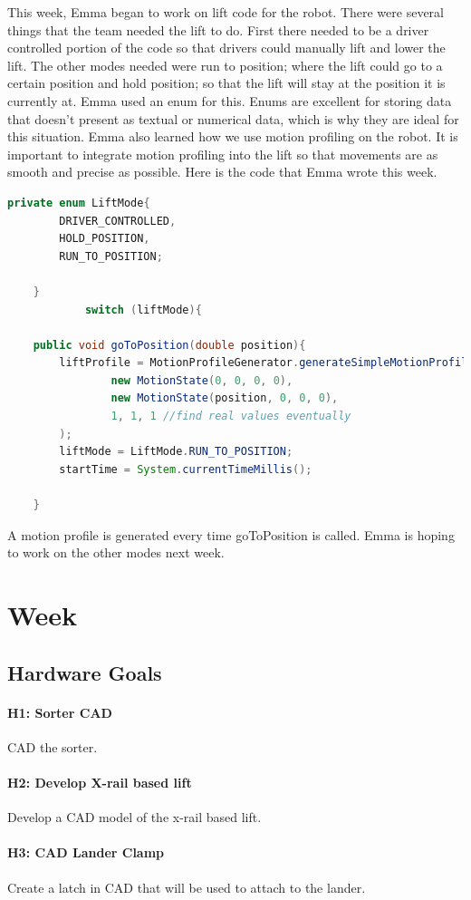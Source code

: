 \documentclass{article}
\begin{document}
This week, Emma began to work on lift code for the robot. There were several things that the team needed the lift to do. First there needed to be a driver controlled portion of the code so that drivers could manually lift and lower the lift. The other modes needed were run to position; where the lift could go to a certain position and hold position; so that the lift will stay at the position it is currently at. Emma used an enum for this. Enums are excellent for storing data that doesn't present as textual or numerical data, which is why they are ideal for this situation. Emma also learned how we use motion profiling on the robot. It is important to integrate motion profiling into the lift so that movements are as smooth and precise as possible. Here is the code that Emma wrote this week.
\begin{lstlisting}[language=Java]
    private enum LiftMode{
        DRIVER_CONTROLLED,
        HOLD_POSITION,
        RUN_TO_POSITION;

    }
            switch (liftMode){

    public void goToPosition(double position){
        liftProfile = MotionProfileGenerator.generateSimpleMotionProfile(
                new MotionState(0, 0, 0, 0),
                new MotionState(position, 0, 0, 0),
                1, 1, 1 //find real values eventually
        );
        liftMode = LiftMode.RUN_TO_POSITION;
        startTime = System.currentTimeMillis();

    }
\end{lstlisting}
A motion profile is generated every time goToPosition is called. Emma is hoping to work on the other modes next week.
\clearpage \newpage \section{Week \thesection} 
\subsection{Hardware Goals}
\paragraph{H1: Sorter CAD}
 CAD the sorter.
\paragraph{H2: Develop X-rail based lift}
 Develop a CAD model of the x-rail based lift.
\paragraph{H3: CAD Lander Clamp}
 Create a latch in CAD that will be used to attach to the lander. 
\end{document}
